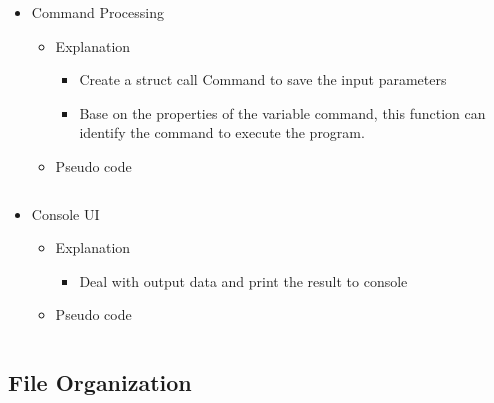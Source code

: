 \begin{itemize}
\begin{itemize}
\begin{itemize}
        \end{itemize}
        \item Pseudo code
        \begin{verbatim}
        \end{verbatim}
    \end{itemize}
    \item Command Processing
    \begin{itemize}
        \item Explanation
        \begin{itemize}
            \item Create a struct call Command to save the input parameters
            \item Base on the properties of the variable command, this function can identify the command to execute the program.
        \end{itemize}
        \item Pseudo code
        \begin{verbatim}
        \end{verbatim}
    \end{itemize}
    \item Console UI
    \begin{itemize}
        \item Explanation
        \begin{itemize}
            \item Deal with output data and print the result to console
        \end{itemize}
        \item Pseudo code
        \begin{verbatim}
        \end{verbatim}
    \end{itemize}
\end{itemize}

\subsection{File Organization}

